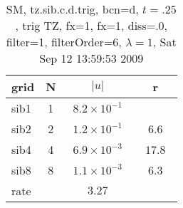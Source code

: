 \begin{table}[hbt]\tableFont %
\begin{center}
\begin{tabular}{|l|c|c|c|} \hline 
grid  & N &  $\vert u \vert$   & r \\ \hline 
                sib1 &     1 & ~$8.2\times10^{ -1}$~ &            \\ \hline
                sib2 &     2 & ~$1.2\times10^{ -1}$~ & ~$  6.6$~  \\ \hline
                sib4 &     4 & ~$6.9\times10^{ -3}$~ & ~$ 17.8$~  \\ \hline
                sib8 &     8 & ~$1.1\times10^{ -3}$~ & ~$  6.3$~  \\ \hline
    rate             &       &       $3.27$         &        \\ \hline
\end{tabular}
\caption{SM, tz.sib.c.d.trig, bcn=d, $t=.25$, trig TZ, fx=1, fx=1, diss=.0, filter=1, filterOrder=6, $\lambda=1$, Sat Sep 12 13:59:53 2009}\label{table:tz.sib.c.d.trig}
\end{center}
\end{table}
